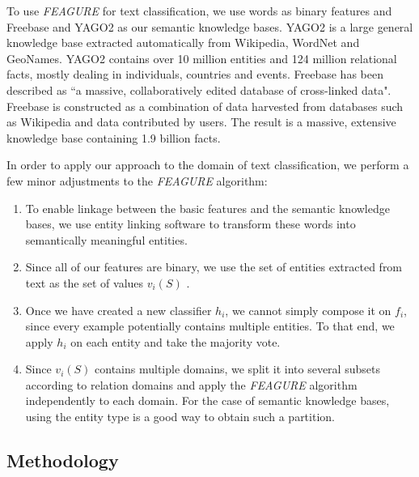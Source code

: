 \documentclass{article}
\theoremstyle{definition}
\begin{document}

To use \emph{FEAGURE} for text classification, we use words as binary features and Freebase and YAGO2 as our semantic knowledge bases.
YAGO2 \citep{hoffart2013yago2} is a large general knowledge base extracted automatically from Wikipedia, WordNet and GeoNames.
YAGO2 contains over 10 million entities and 124 million relational facts, mostly dealing in individuals, countries and events.
Freebase \citep{bollacker2008freebase} has been described as ``a massive, collaboratively edited database of cross-linked data". Freebase is constructed as a combination of data harvested from databases such as Wikipedia and data contributed by users. The result is a massive, extensive knowledge base containing 1.9 billion facts. 

In order to apply our approach to the domain of text classification, we perform a few minor adjustments to the \emph{FEAGURE} algorithm:
\begin{enumerate}
	\item To enable linkage between the basic features and the semantic knowledge bases, we use entity linking software \citep{hoffart2011robust,milne2013open} to transform these words into semantically meaningful entities.
	\item Since all of our features are binary, we use the set of entities extracted from text	as the set of values $v_i(S)$ .
	\item Once we have created a new classifier $h_i$, we cannot simply compose it on $f_i$, since every example potentially contains multiple entities. To that end,  we apply $h_i$ on each entity and take the majority vote.
	\item Since $v_i(S)$ contains multiple domains,  we split it into several subsets according to relation domains and apply the \emph{FEAGURE} algorithm independently to each domain. For the case of semantic knowledge bases, using the entity type is a good way to obtain such a partition.
\end{enumerate}

\subsection{Methodology}
\end{document}
